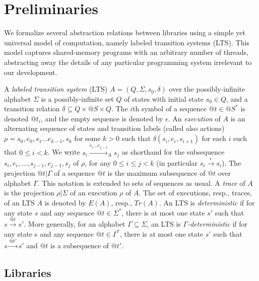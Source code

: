 \section{Preliminaries}

We formalize several abstraction relations between libraries using a simple
yet universal model of computation, namely labeled transition systems (LTS).
This model captures shared-memory programs with an arbitrary number of threads,
abstracting away the details of any particular programming system irrelevant to
our development.

A \emph{labeled transition system} (LTS) $A=(Q,\Sigma, s_0, \delta)$ over the 
possibly-infinite alphabet $\Sigma$ is a possibly-infinite set $Q$ of states with
initial state $s_0 \in Q$, and a transition relation $\delta \subseteq Q \times @S \times
Q$. The $i$th symbol of a sequence $@t \in @S^*$ is denoted $@t_i$, and the empty
sequence is denoted by $\epsilon$.
An \emph{execution} of $A$ is an alternating sequence of states and transition labels (called also actions)
$\rho = s_0, e_0,s_1\ldots e_{k-1},s_k$ for some $k>0$ such that $\delta(s_i, e_i, s_{i+1})$
for each $i$ such that $0\leq i<k$. We write $s_i\xrightarrow{e_i\ldots e_{j-1}}_A s_j$ as shorthand for 
the subsequence $s_i,e_i,...,s_{j-1},e_{j-1},s_j$ of $\rho$, for any $0\leq i\leq j <k$
(in particular $s_i\xrightarrow{\epsilon}s_i$).
The projection $@t| \Gamma$ of a sequence $@t$ is the maximum subsequence of $@t$ over
 alphabet $\Gamma$. This notation is extended to sets of sequences as usual.
A \emph{trace} of $A$ is the projection $\rho | \Sigma$ of an execution $\rho$ of $A$. 
The set of executions, resp., traces, of an LTS $A$ is denoted by $E(A)$, resp., $Tr(A)$.
An LTS is \emph{deterministic} if for any state $s$ and any sequence $@t\in \Sigma^*$, there is at most
one state $s'$ such that $s\xrightarrow{@t}s'$. More generally, for an alphabet $\Gamma\subseteq \Sigma$,
an LTS is \emph{$\Gamma$-deterministic} if for any state s and any sequence $@t\in \Gamma^*$, there
is at most one state $s'$ such that $s\xrightarrow{@t'}s'$ and $@t$ is a subsequence of $@t'$.

\subsection{Libraries}

